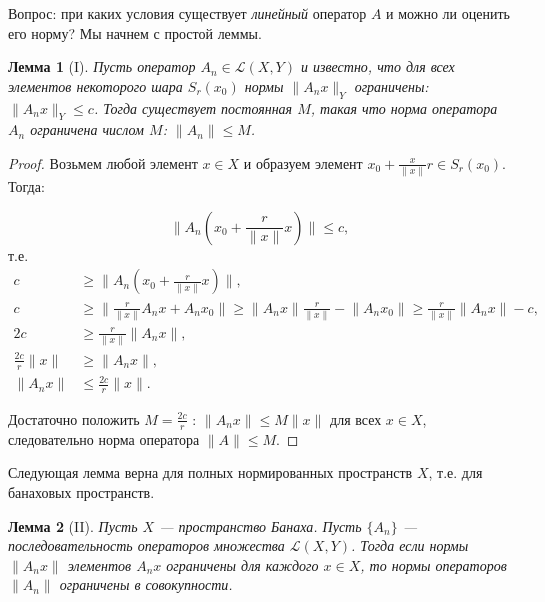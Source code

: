 \documentclass[12pt,a4paper,titlepage,oneside]{book}
\theoremstyle{definition}
\theoremstyle{plain}
\theoremstyle{break}
\theoremstyle{remark}
\theoremstyle{remark}
\theoremstyle{remark}
\theoremstyle{remark}
\theoremstyle{plain}
\newtheorem*{lemma}{Лемма}
\theoremstyle{plain}
\begin{document}
Вопрос: при каких условия существует \textit{линейный} оператор $A$ и можно ли оценить его норму? Мы начнем с простой леммы.

\begin{lemma}[I]
Пусть оператор $A_n \in \mathcal{L}(X,Y)$ и известно, что для всех элементов некоторого шара $S_r(x_0)$ нормы $\lVert A_n x\rVert_Y$ ограничены: $\lVert A_n x\rVert_Y \leqslant c$. Тогда существует постоянная $M$, такая что норма оператора $A_n$ ограничена числом $M$: $\lVert A_n \rVert \leqslant M$.
\end{lemma}

\begin{proof}
Возьмем любой элемент $x \in X$ и образуем элемент $x_0+\frac{x}{\lVert x\rVert}r \in S_r(x_0)$. Тогда:

$$\lVert A_n(x_0+\frac{r}{\lVert x \rVert}x) \rVert \leqslant c,$$
т.е.
\begin{align*}
c &\geqslant \lVert A_n(x_0+\frac{r}{\lVert x \rVert}x) \rVert,\\
c &\geqslant \lVert \frac{r}{\lVert x \rVert}A_n x + A_n x_0 \rVert \geqslant \lVert A_n x \rVert \frac{r}{\lVert x\rVert} - \lVert A_n x_0 \rVert \geqslant \frac{r}{\lVert x \rVert}\lVert A_n x \rVert - c,\\
2c &\geqslant \frac{r}{\lVert x \rVert}\lVert A_n x\rVert,\\
\frac{2c}{r}\lVert x \rVert &\geqslant \lVert A_n x\rVert,\\
\lVert A_n x \rVert &\leqslant \frac{2c}{r}\lVert x \rVert.
\end{align*}

Достаточно положить $M=\frac{2c}{r}$ : $\lVert A_n x\rVert \leqslant M\lVert x\rVert$ для всех $x \in X$, следовательно норма оператора $\lVert A\rVert \leqslant M$.
\end{proof}

Следующая лемма верна для полных нормированных пространств $X$, т.е. для банаховых пространств.

\begin{lemma}[II]
Пусть $X$ --- пространство Банаха. Пусть $\lbrace A_n\rbrace$ --- последовательность операторов множества $\mathcal{L}(X,Y)$. Тогда если нормы $\lVert A_n x\rVert$ элементов $A_n x$ ограничены для каждого $x \in X$, то нормы операторов $\lVert A_n\rVert$ ограничены в совокупности.
\end{lemma}
\end{document}
